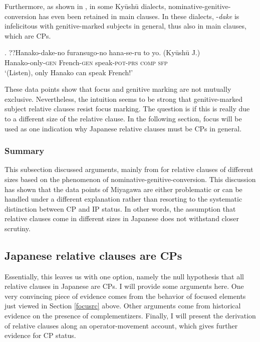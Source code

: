 Furthermore, as shown in \citet{ochi:2017:ga}, in some Kyūshū dialects, nominative-genitive-conversion has even been retained in main clauses. In these dialects, -\textit{dake} is infelicitous with genitive-marked subjects in general, thus also in main clauses, which are CPs. 

\exg. ??Hanako-dake-no furansugo-no hana-se-ru to yo. (Kyūshū J.)\\
Hanako-only-\textsc{gen} French-\textsc{gen} speak-\textsc{pot-prs} \textsc{comp} \textsc{sfp}\\
`(Listen), only Hanako can speak French!’ \\ \null \hfill \citep[692]{ochi:2017:ga}

These data points show that focus and genitive marking are not mutually exclusive. Nevertheless, the intuition seems to be strong that genitive-marked subject relative clauses resist focus marking. The question is if this is really due to a different size of the relative clause. In the following section, focus will be used as one indication why Japanese relative clauses must be CPs in general.

\subsubsection{Summary}

This subsection discussed arguments, mainly from \citet{miyagawa:2011:genitive, miyagawa:2012:case, miyagawa:2017:agreement} for relative clauses of different sizes based on the phenomenon of nominative-genitive-conversion. This discussion has shown that the data points of Miyagawa are either problematic or can be handled under a different explanation rather than resorting to the systematic distinction between CP and IP status. In other words, the assumption that relative clauses come in different sizes in Japanese does not withstand closer scrutiny.

\subsection{Japanese relative clauses are CPs} \label{kaplan}

Essentially, this leaves us with one option, namely the null hypothesis that all relative clauses in Japanese are CPs. I will provide some arguments here. One very convincing piece of evidence comes from the behavior of focused elements just viewed in Section \ref{focusrc} above. Other arguments come from historical evidence on the presence of complementizers. Finally, I will present the derivation of relative clauses along an operator-movement account, which gives further evidence for CP status.

